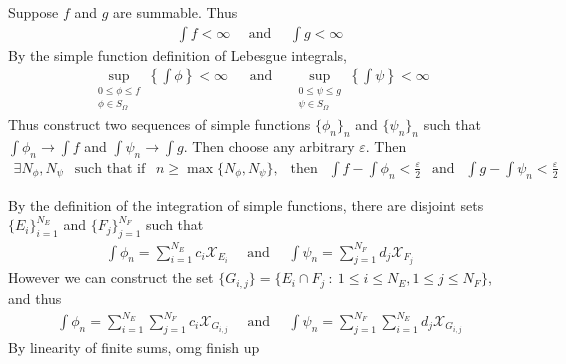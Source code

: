 \documentclass[12pt]{article}
\theoremstyle{plain}
\begin{document}
Suppose $f$ and $g$ are summable.  Thus
\begin{align*}
    \int f < \infty\ \ \ \ \ \ \text{and}\ \ \ \ \ \ \int g < \infty
\end{align*}
By the simple function definition of Lebesgue integrals,
\begin{align*}
    \sup_{\substack{0 \leq \phi \leq f \\ \phi \in S_\Omega}}\left\{\int \phi \right\} < \infty\ \ \ \ \ \ \ \text{and}\ \ \ \ \ \ \sup_{\substack{0 \leq \psi \leq g \\ \psi \in S_\Omega}}\left\{\int \psi \right\} <  \infty
\end{align*}
Thus construct two sequences of simple functions $\{\phi_n\}_n$ and $\{\psi_n\}_n$ such that $\int \phi_n \rightarrow \int f$ and $\int \psi_n \rightarrow \int g$.  Then choose any arbitrary $\varepsilon$.  Then
\begin{align*}
    \exists N_\phi, N_\psi\ \ \text{ such that if }\ \ n \geq \max\{N_\phi, N_\psi\},\ \ \text{ then }\ \ \int f - \int \phi_n < \frac{\varepsilon}{2}\ \ \text{ and }\ \ \int g - \int \psi_n < \frac{\varepsilon}{2}
\end{align*}

By the definition of the integration of simple functions, there are disjoint sets $\{E_i\}_{i = 1}^{N_E}$ and $\{F_j\}_{j = 1}^{N_F}$ such that
\begin{align*}
    \int \phi_n = \sum_{i = 1}^{N_E} c_i\mathcal{X}_{E_i}\ \ \ \ \ \ \text{and}\ \ \ \ \ \ \int \psi_n = \sum_{j = 1}^{N_F} d_j\mathcal{X}_{F_j}
\end{align*}
However we can construct the set $\{G_{i,j}\} = \{E_i \cap F_j\ :\ 1 \leq i \leq N_E, 1 \leq j \leq N_F\}$, and thus
\begin{align*}
    \int \phi_n = \sum_{i = 1}^{N_E}\sum_{j = 1}^{N_F} c_i\mathcal{X}_{G_{i,j}}\ \ \ \ \ \ \text{and}\ \ \ \ \ \ \int \psi_n = \sum_{j = 1}^{N_F}\sum_{i = 1}^{N_E} d_j\mathcal{X}_{G_{i,j}}
\end{align*}
By linearity of finite sums,
{\color{red} omg finish up}
\end{document}
